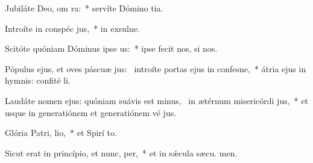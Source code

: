 \item Jubiláte Deo, om ra:~* servíte Dómino  tia.
\item Introíte in conspéc jus,~* in exsulne.
\item Scitóte quóniam Dóminus ipse  us:~* ipse fecit nos,   si nos.
\item Pópulus ejus, et oves páscuæ jus:~\pscross{} introíte portas ejus in confesne,~* átria ejus in hymnis: confité li.
\item Laudáte nomen ejus: quóniam suávis est minus,~\pscross{} in ætérnum misericórdi jus,~* et usque in generatiónem et generatiónem vé jus.
\item Glória Patri,  lio,~* et Spirí to.
\item Sicut erat in princípio, et nunc,  per,~* et in sǽcula sæcu. men.
